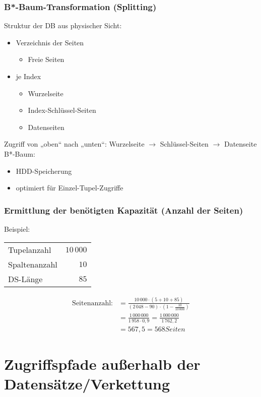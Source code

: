 \subsubsection{B*-Baum-Transformation (Splitting)}

Struktur der DB aus physischer Sicht:
\begin{itemize}
\item Verzeichnis der Seiten
\begin{itemize}
\item Freie Seiten
\end{itemize}
\item je Index
\begin{itemize}
\item Wurzelseite
\item Index-Schlüssel-Seiten
\item Datenseiten
\end{itemize}
\end{itemize}
Zugriff von „oben“ nach „unten“: Wurzelseite $\to$ Schlüssel-Seiten $\to$ Datenseite\bigskip\\
B*-Baum:
\begin{itemize}
\item HDD-Speicherung
\item optimiert für Einzel-Tupel-Zugriffe
\end{itemize}
\subsubsection{Ermittlung der benötigten Kapazität (Anzahl der Seiten)}
Beispiel:\\
\begin{tabular}{l r}
Tupelanzahl & $10\,000$\\
Spaltenanzahl & $10$\\
DS-Länge & $85$
\end{tabular}
\begin{align*}
\text{Seitenanzahl:}&=\frac{10\,000 \cdot (5+10+85)}{(2\,048-90)\cdot \left(1-\frac{10}{10\,000}\right)}\\
&= \frac{1\,000\,000}{1\,958\cdot 0,9}= \frac{1\,000\,000}{1\,762,2}\\
&=567,5 = 568 \unit{Seiten}
\end{align*}

\section{Zugriffspfade außerhalb der Datensätze/Verkettung}

